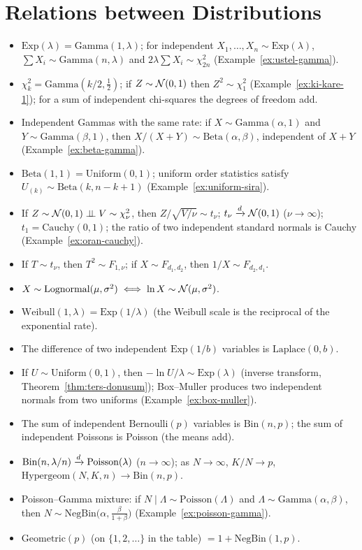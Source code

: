 \documentclass[main.tex]{subfiles}
\begin{document}
\section{Relations between Distributions}

\begin{itemize}
  \item $\text{Exp}(\lambda)=\text{Gamma}(1,\lambda)$; for independent $X_1,\dots,X_n\sim\text{Exp}(\lambda)$, $\sum X_i\sim\text{Gamma}(n,\lambda)$ and $2\lambda\sum X_i\sim\chi^2_{2n}$ (Example~\ref{ex:ustel-gamma}).
  \item $\chi^2_k=\text{Gamma}(k/2,\tfrac12)$; if $Z\sim\mathcal{N}(0,1)$ then $Z^2\sim\chi^2_1$ (Example~\ref{ex:ki-kare-1}); for a sum of independent chi-squares the degrees of freedom add.
  \item Independent Gammas with the same rate: if $X\sim\text{Gamma}(\alpha,1)$ and $Y\sim\text{Gamma}(\beta,1)$, then $X/(X+Y)\sim\text{Beta}(\alpha,\beta)$, independent of $X+Y$ (Example~\ref{ex:beta-gamma}).
  \item $\text{Beta}(1,1)=\text{Uniform}(0,1)$; uniform order statistics satisfy $U_{(k)}\sim\text{Beta}(k,n-k+1)$ (Example~\ref{ex:uniform-sira}).
  \item If $Z\sim\mathcal{N}(0,1)\perp\!\!\!\perp V\sim\chi^2_\nu$, then $Z/\sqrt{V/\nu}\sim t_\nu$; $t_\nu\xrightarrow{d}\mathcal{N}(0,1)$ ($\nu\to\infty$); $t_1=\text{Cauchy}(0,1)$; the ratio of two independent standard normals is Cauchy (Example~\ref{ex:oran-cauchy}).
  \item If $T\sim t_\nu$, then $T^2\sim F_{1,\nu}$; if $X\sim F_{d_1,d_2}$, then $1/X\sim F_{d_2,d_1}$.
  \item $X\sim\text{Lognormal}(\mu,\sigma^2)\iff\ln X\sim\mathcal{N}(\mu,\sigma^2)$.
  \item $\text{Weibull}(1,\lambda)=\text{Exp}(1/\lambda)$ (the Weibull scale is the reciprocal of the exponential rate).
  \item The difference of two independent $\text{Exp}(1/b)$ variables is $\text{Laplace}(0,b)$.
  \item If $U\sim\text{Uniform}(0,1)$, then $-\ln U/\lambda\sim\text{Exp}(\lambda)$ (inverse transform, Theorem~\ref{thm:ters-donusum}); Box--Muller produces two independent normals from two uniforms (Example~\ref{ex:box-muller}).
  \item The sum of independent $\text{Bernoulli}(p)$ variables is $\text{Bin}(n,p)$; the sum of independent Poissons is Poisson (the means add).
  \item $\text{Bin}(n,\lambda/n)\xrightarrow{d}\text{Poisson}(\lambda)$ ($n\to\infty$); as $N\to\infty$, $K/N\to p$, $\text{Hypergeom}(N,K,n)\to\text{Bin}(n,p)$.
  \item Poisson--Gamma mixture: if $N\mid\Lambda\sim\text{Poisson}(\Lambda)$ and $\Lambda\sim\text{Gamma}(\alpha,\beta)$, then $N\sim\text{NegBin}\big(\alpha,\frac{\beta}{1+\beta}\big)$ (Example~\ref{ex:poisson-gamma}).
  \item $\text{Geometric}(p)$ (on $\{1,2,\dots\}$ in the table) $=1+\text{NegBin}(1,p)$.
\end{itemize}
\end{document}
